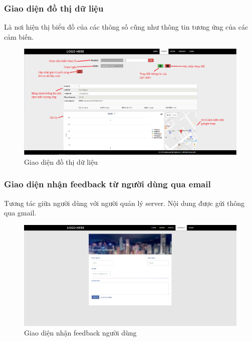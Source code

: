 \subsubsection*{Giao diện đồ thị dữ liệu}
Là nơi hiện thị biểu đồ của các thông số cũng như thông tin tương ứng của các cảm biến.
\begin{center}
\begin{figure}[H]
\centering    
\includegraphics[width=1\textwidth]{web_graph}
\caption[Giao diện đồ thị dữ liệu]{Giao diện đồ thị dữ liệu}
\label{fig:web_graph}
\end{figure}
\end{center}



\subsubsection*{Giao diện nhận feedback từ người dùng qua email}
Tương tác giữa người dùng với người quản lý server. Nội dung được gửi thông qua gmail.
\begin{center}
\begin{figure}[H]
\centering    
\includegraphics[width=1\textwidth]{web_email}
\caption[Giao diện nhận feedback người dùng]{Giao diện nhận feedback người dùng}
\label{fig:web_email}
\end{figure}
\end{center}

